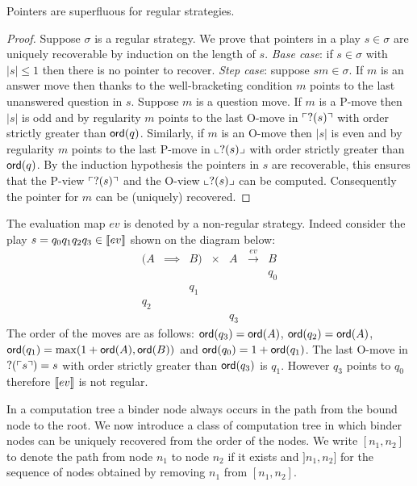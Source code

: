 \begin{lem}
\label{lem:regular_pointers_uniqu_recover}
Pointers are superfluous for regular strategies.
\end{lem}
\begin{proof}
Suppose $\sigma$ is a regular strategy. We prove that pointers in a play $s\in \sigma$ are uniquely recoverable by induction on the length of $s$.
\noindent \emph{Base case}: if $s \in \sigma$ with $|s| \leq 1$ then there is no pointer to recover.
\noindent \emph{Step case}: suppose $s m \in \sigma$. If $m$ is an answer move then
thanks to the well-bracketing condition $m$ points to the last unanswered question in $s$.
Suppose $m$ is a question move.
If $m$ is a P-move then $|s|$ is odd and by regularity
$m$ points to the last O-move in $\ulcorner ?(s) \urcorner$ with order strictly greater than ${\sf ord}(q)$.
Similarly, if $m$ is an O-move then $|s|$ is even and by regularity
$m$ points to the last P-move in $\llcorner ?(s) \lrcorner$ with order strictly greater than ${\sf ord}(q)$.
By the induction hypothesis the pointers in $s$ are recoverable, this ensures that the
P-view $\ulcorner ?(s) \urcorner$ and the O-view $\llcorner ?(s) \lrcorner$ can be computed. Consequently the pointer for $m$ can be (uniquely) recovered.
\end{proof}

\begin{exmp}
The evaluation map $ev$ is denoted by a non-regular strategy. Indeed consider the play $s = q_0 q_1 q_2 q_3 \in {[\![ev ]\!]}$
shown on the diagram below:
$$\begin{array}{cccccccc}
(A & \implies & B) & \times  & A & \stackrel{ev}{\longrightarrow} & B \\
&&&&&& q_0 \\
&& q_1 \\
 q_2 \\
 &&&&q_3
\end{array}$$
The order of the moves are as follows:  ${\sf ord}(q_3) = {\sf ord}(A)$, ${\sf ord}(q_2) = {\sf ord}(A)$,
${\sf ord}(q_1) = \max( 1+{\sf ord}(A), {\sf ord}(B))$ and ${\sf ord}(q_0) = 1 + {\sf ord}(q_1)$.
The last O-move in $?(\ulcorner s \urcorner)= s$ with order strictly greater than ${\sf ord}(q_3)$ is $q_1$. However $q_3$ points to $q_0$ therefore ${[\![ ev ]\!]}$ is not regular.
\end{exmp}


In a computation tree a binder node always occurs in the path from the bound node to the root.
We now introduce a class of computation tree in which binder nodes can be uniquely recovered from the order of the nodes.
We write $[n_1,n_2]$ to denote the path from node $n_1$ to node $n_2$ if it exists and $]n_1,n_2]$ for
the sequence of nodes obtained by removing $n_1$ from $[n_1,n_2]$.

